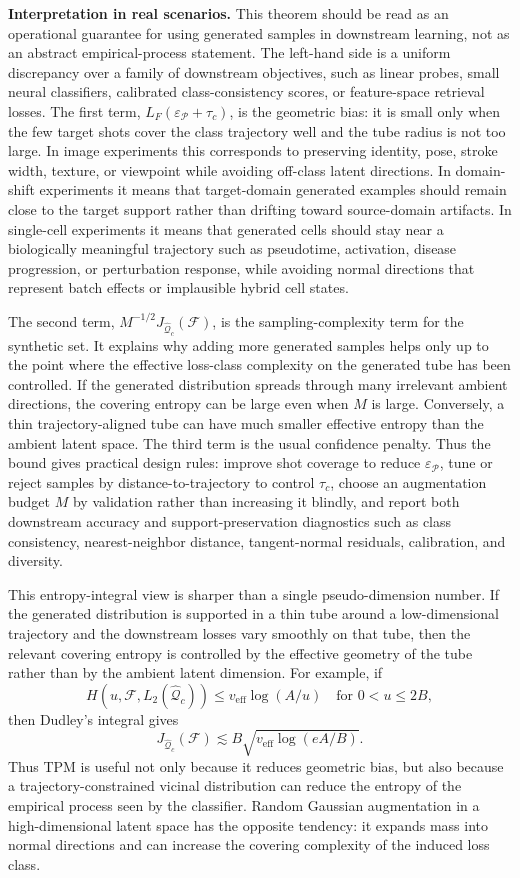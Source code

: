 \documentclass{article}
\begin{document}
\textbf{Interpretation in real scenarios.}
This theorem should be read as an operational guarantee for using generated samples in downstream learning, not as an abstract empirical-process statement. The left-hand side is a uniform discrepancy over a family of downstream objectives, such as linear probes, small neural classifiers, calibrated class-consistency scores, or feature-space retrieval losses. The first term, $L_F(\varepsilon_{\mathcal{P}}+\tau_c)$, is the geometric bias: it is small only when the few target shots cover the class trajectory well and the tube radius is not too large. In image experiments this corresponds to preserving identity, pose, stroke width, texture, or viewpoint while avoiding off-class latent directions. In domain-shift experiments it means that target-domain generated examples should remain close to the target support rather than drifting toward source-domain artifacts. In single-cell experiments it means that generated cells should stay near a biologically meaningful trajectory such as pseudotime, activation, disease progression, or perturbation response, while avoiding normal directions that represent batch effects or implausible hybrid cell states.

The second term, $M^{-1/2}J_{\widehat{\mathcal{Q}}_c}(\mathcal{F})$, is the sampling-complexity term for the synthetic set. It explains why adding more generated samples helps only up to the point where the effective loss-class complexity on the generated tube has been controlled. If the generated distribution spreads through many irrelevant ambient directions, the covering entropy can be large even when $M$ is large. Conversely, a thin trajectory-aligned tube can have much smaller effective entropy than the ambient latent space. The third term is the usual confidence penalty. Thus the bound gives practical design rules: improve shot coverage to reduce $\varepsilon_{\mathcal{P}}$, tune or reject samples by distance-to-trajectory to control $\tau_c$, choose an augmentation budget $M$ by validation rather than increasing it blindly, and report both downstream accuracy and support-preservation diagnostics such as class consistency, nearest-neighbor distance, tangent-normal residuals, calibration, and diversity.

This entropy-integral view is sharper than a single pseudo-dimension number. If the generated distribution is supported in a thin tube around a low-dimensional trajectory and the downstream losses vary smoothly on that tube, then the relevant covering entropy is controlled by the effective geometry of the tube rather than by the ambient latent dimension. For example, if
\[
	H(u,\mathcal{F},L_2(\widehat{\mathcal{Q}}_c))
	\le
	v_{\mathrm{eff}}\log(A/u)
	\quad\text{for }0<u\le 2B,
\]
then Dudley's integral gives
\[
	J_{\widehat{\mathcal{Q}}_c}(\mathcal{F})
	\lesssim
	B\sqrt{v_{\mathrm{eff}}\log(eA/B)}.
\]
Thus TPM is useful not only because it reduces geometric bias, but also because a trajectory-constrained vicinal distribution can reduce the entropy of the empirical process seen by the classifier. Random Gaussian augmentation in a high-dimensional latent space has the opposite tendency: it expands mass into normal directions and can increase the covering complexity of the induced loss class.
\end{document}
